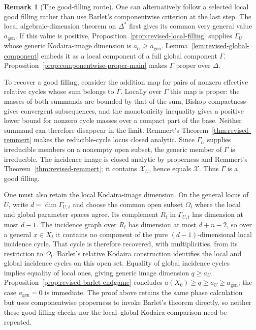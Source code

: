 \documentclass[11pt]{amsart}
\numberwithin{equation}{section}
\theoremstyle{plain}
\theoremstyle{definition}
\newtheorem{rem}[thm]{Remark}
\newcommand{\cX}{\mathcal X}
\begin{document}
\begin{rem}[The good-filling route]
\label{rem:componentwise-good-filling-route}
One can alternatively follow a selected local good filling rather
than use Barlet's componentwise criterion at the last step.
The local algebraic-dimension
theorem on $\Delta^*$ first gives its common very general value
$a_{\mathrm{gen}}$.  If this value is positive,
Proposition~\ref{prop:revised-local-filling} supplies $\Gamma_U$ whose
generic Kodaira-image dimension is $a_U\ge a_{\mathrm{gen}}$.
Lemma~\ref{lem:revised-global-component} embeds it as a local component of
a full global component $\Gamma$.
Proposition~\ref{prop:componentwise-proper-main} makes $\Gamma$
proper over $\Delta$.

To recover a good filling, consider the addition map for pairs of
nonzero effective relative cycles whose sum belongs to $\Gamma$.
Locally over $\Gamma$ this map is proper: the masses of both summands
are bounded by that of the sum, Bishop compactness gives convergent
subsequences, and the monotonicity inequality gives a positive lower
bound for nonzero cycle masses over a compact part of the base.
Neither summand can therefore disappear in the limit.  Remmert's
Theorem~\ref{thm:revised-remmert} makes the reducible-cycle locus
closed analytic.
Since $\Gamma_U$ supplies irreducible members on a nonempty
open subset, the generic member of $\Gamma$ is irreducible.
The incidence image is closed analytic by properness and Remmert's
Theorem~\ref{thm:revised-remmert}; it contains $\cX_U$, hence equals $\cX$.
Thus $\Gamma$ is a good filling.

One must also retain the local Kodaira-image dimension.  On the
general locus of $U$, write $d=\dim\Gamma_{U,t}$ and choose the
common open subset $\Omega_t$ where the local and global parameter
spaces agree.  Its complement $R_t$ in $\Gamma_{U,t}$ has dimension
at most $d-1$.  The incidence graph over $R_t$ has dimension at most
$d+n-2$, so over a general $x\in X_t$ it contains no component of
the pure $(d-1)$-dimensional local incidence cycle.  That cycle is
therefore recovered, with multiplicities, from its restriction to
$\Omega_t$.  Barlet's relative Kodaira construction
\cite[\S~2.2]{Ba15} identifies the local and global incidence cycles
on this open set.  Equality of global incidence cycles implies
equality of local ones, giving generic image dimension $q\ge a_U$.
Proposition~\ref{prop:revised-barlet-endgame} concludes
$a(X_0)\ge q\ge a_U\ge a_{\mathrm{gen}}$; the case
$a_{\mathrm{gen}}=0$ is immediate.  The proof above retains the
same phase calculation but uses componentwise properness to invoke
Barlet's theorem directly, so neither these good-filling checks nor
the local--global Kodaira comparison need be repeated.
\end{rem}
\end{document}

